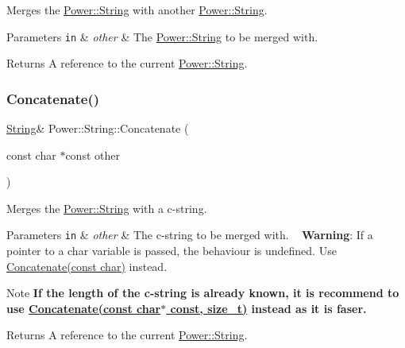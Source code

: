 Merges the \hyperlink{class_power_1_1_string}{Power\+::\+String} with another \hyperlink{class_power_1_1_string}{Power\+::\+String}. 


\begin{DoxyParams}[1]{Parameters}
\mbox{\tt in}  & {\em other} & The \hyperlink{class_power_1_1_string}{Power\+::\+String} to be merged with. \\
\hline
\end{DoxyParams}
\begin{DoxyReturn}{Returns}
A reference to the current \hyperlink{class_power_1_1_string}{Power\+::\+String}. 
\end{DoxyReturn}
\mbox{\label{class_power_1_1_string_a366471411eb6e5eed0cc6b4754d740fb}} 
\subsubsection{\texorpdfstring{Concatenate()}{Concatenate()}\hspace{0.1cm}{\footnotesize\ttfamily [2/4]}}
{\footnotesize\ttfamily \hyperlink{class_power_1_1_string}{String}\& Power\+::\+String\+::\+Concatenate (\begin{DoxyParamCaption}\item[{const char $\ast$const}]{other }\end{DoxyParamCaption})\hspace{0.3cm}{\ttfamily [inline]}}



Merges the \hyperlink{class_power_1_1_string}{Power\+::\+String} with a c-\/string. 


\begin{DoxyParams}[1]{Parameters}
\mbox{\tt in}  & {\em other} & The c-\/string to be merged with. ~\newline
 {\bfseries Warning}\+: If a pointer to a char variable is passed, the behaviour is undefined. Use \hyperlink{class_power_1_1_string_a27c784f6b30c2ca3504cb217a3f3107a}{Concatenate(const char)} instead. \\
\hline
\end{DoxyParams}
\begin{DoxyNote}{Note}
{\bfseries If the length of the c-\/string is already known, it is recommend to use \hyperlink{class_power_1_1_string_a8e0ee550a677843cb4cf2eb855522711}{Concatenate(const char$\ast$ const, size\+\_\+t)} instead as it is faser.} 
\end{DoxyNote}
\begin{DoxyReturn}{Returns}
A reference to the current \hyperlink{class_power_1_1_string}{Power\+::\+String}. 
\end{DoxyReturn}
\mbox{\label{class_power_1_1_string_a8e0ee550a677843cb4cf2eb855522711}} 
